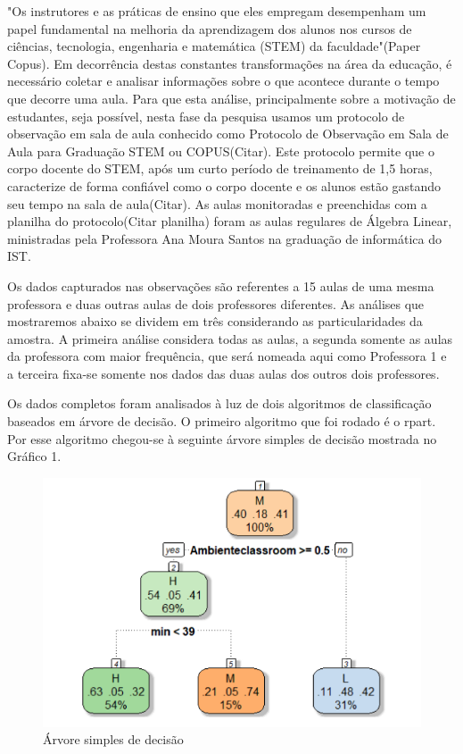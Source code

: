 "Os instrutores e as práticas de ensino que eles empregam desempenham um papel fundamental na melhoria da aprendizagem dos alunos nos cursos de ciências, tecnologia, engenharia e matemática (STEM) da faculdade"(Paper Copus). Em decorrência destas constantes transformações na área da educação, é necessário coletar e analisar informações sobre o que acontece durante o tempo que decorre uma aula. Para que esta análise, principalmente sobre a motivação de estudantes, seja possível, nesta fase da pesquisa usamos um protocolo de observação em sala de aula conhecido como Protocolo de Observação em Sala de Aula para Graduação STEM ou COPUS(Citar). Este protocolo permite que o corpo docente do STEM, após um curto período de treinamento de 1,5 horas, caracterize de forma confiável como o corpo docente e os alunos estão gastando seu tempo na sala de aula(Citar). As aulas monitoradas e preenchidas com a planilha do protocolo(Citar planilha) foram as aulas regulares de Álgebra Linear, ministradas pela Professora Ana Moura Santos na graduação de informática do IST.

Os dados capturados nas observações são referentes a 15 aulas de uma mesma professora e duas outras aulas de dois professores diferentes. As análises que mostraremos abaixo se dividem em três considerando as particularidades da amostra. A primeira análise considera todas as aulas, a segunda somente as aulas da professora com maior frequência, que será nomeada aqui como Professora 1 e a terceira fixa-se somente nos dados das duas aulas dos outros dois professores.

Os dados completos foram analisados à luz de dois algoritmos de classificação baseados em árvore de decisão.
O primeiro algoritmo que foi rodado é o rpart. Por esse algoritmo chegou-se à seguinte árvore simples de decisão mostrada no Gráfico 1.


\begin{figure}
    \centering
    \includegraphics[width=.9\textwidth]{chaps/Images/figura1copus.png}
    \caption{Árvore simples de decisão}
    \label{fig:arvore_simples_decisao}
\end{figure}

